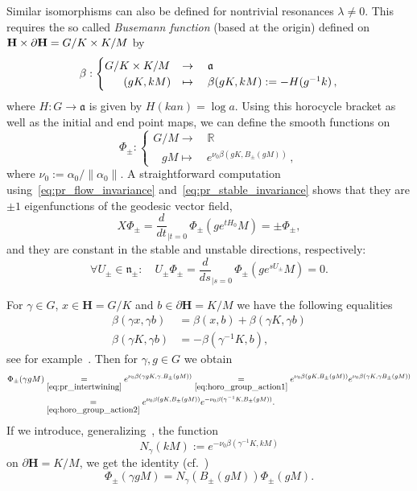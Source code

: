 \documentclass[AHL, Unicode, longabstracts, published]{cedram}
\newcommand{\bfh}{\mathbf{H}}
\newcommand{\pl}{\partial}
\newcommand{\x}{\times}
\newcommand{\R}{\mathbb R}
\newcommand{\n}{\mathfrak n}
\renewcommand{\a}{\mathfrak a}
\let\oldforall\forall
\renewcommand*{\forall}{\mathrel{\oldforall}}
\begin{document}
Similar isomorphisms can also be defined for nontrivial resonances $\lambda\neq 0$. This requires the so called \emph{Busemann function} (based at the origin) defined on ${\bfh}\x \pl{\bfh}\linebreak=G/K\times K/M$ by
\begin{equation}\label{eq:def_horocycle}
\beta: 
\begin{cases}
G/K\times K/M & \rightarrow\quad\a \\
\mkern 30mu(gK,kM) & \mapsto\quad\beta(gK,kM) :=-H(g^{-1}k)\,,
\end{cases}
\end{equation}
where $H\colon G\to \mathfrak a$ is given by $H(kan)=\log a$. Using this horocycle bracket as well as the initial and end point maps, we can define the smooth functions on
\begin{equation}\label{eq:def_Phi_pm}
\Phi_{\pm}:
\begin{cases}
G/M \rightarrow\quad\R\\
\;\;\: gM \mapsto\quad e^{\nu_0 \beta(gK,B_\pm(gM))}\,,
\end{cases}
\end{equation}
where $\nu_0:=\alpha_0/\|\alpha_0\|$. A straightforward computation using~\eqref{eq:pr_flow_invariance} and~\eqref{eq:pr_stable_invariance} shows that they are $\pm 1 $ eigenfunctions of the geodesic vector field,
\begin{equation}\label{eq:Phi_pm_flow}
X\Phi_\pm = \frac{d}{dt}_{|t=0}\,\Phi_\pm \left(ge^{tH_0} M\right) = \pm\Phi_\pm,
\end{equation}
and they are constant in the stable and unstable directions, respectively:
\begin{equation}\label{eq:Phi_pm_stab_unstab}
\forall U_\pm\in \n_\pm :\quad U_\pm\Phi_\pm= \frac{d}{ds}_{|s=0}\,\Phi_{\pm}\left(ge^{sU_\pm} M\right) =0.
\end{equation}


For $\gamma\in G$, $x\in {\bfh}=G/K$ and $b\in \pl{\bfh}= K/M$ we have the following equalities
\begin{align}\label{eq:horo_group_action1}
\beta (\gamma x,\gamma b) &= \beta(x,b) + \beta(\gamma K,\gamma b)\\\label{eq:horo_group_action2}
\beta(\gamma K,\gamma b) &= -\beta(\gamma^{-1}K,b),
\end{align}
see for example~\cite[Lemma~2.3]{HHS12}. Then for $\gamma, g \in G$ we obtain
\begin{align*}
\Phi_\pm(\gamma gM) &\underset{\eqref{eq:pr_intertwining}}= e^{\nu_0\beta(\gamma gK,\gamma.B_\pm(gM))}
\underset{\eqref{eq:horo_group_action1}}{=} e^{\nu_0\beta(gK,B_\pm(gM))} e^{\nu_0\beta(\gamma K, \gamma B_\pm(gM))} \\
&\underset{\eqref{eq:horo_group_action2}}{=}e^{\nu_0\beta(gK,B_\pm(gM))} e^{-\nu_0\beta(\gamma^{-1} K, B_\pm(gM))}.
\end{align*}
If we introduce, generalizing~\cite[(3.26)]{DFG15}, the function
\[
N_\gamma(kM) := e^{-\nu_0\beta(\gamma^{-1} K, kM)}
\]
on $\pl{\bfh}=K/M$, we get the identity (cf.~\cite[(3.28)]{DFG15})
\begin{equation}\label{eq:Phi_pm_trafo}
\Phi_\pm(\gamma gM) = N_\gamma(B_\pm(gM))\Phi_\pm(gM).
\end{equation}
\end{document}

